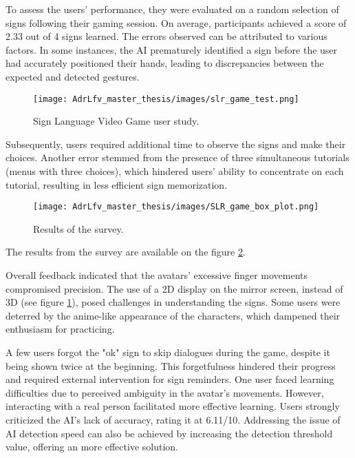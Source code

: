 To assess the users' performance, they were evaluated on a random selection of signs following their gaming session. On average, participants achieved a score of 2.33 out of 4 signs learned. The errors observed can be attributed to various factors. In some instances, the AI prematurely identified a sign before the user had accurately positioned their hands, leading to discrepancies between the expected and detected gestures.

\begin{figure}[h]
    \centering
    \texttt{[image: AdrLfv\_master\_thesis/images/slr\_game\_test.png]}
    \caption{Sign Language Video Game user study.}
    \label{fig:slr_game_test}
\end{figure}

Subsequently, users required additional time to observe the signs and make their choices. Another error stemmed from the presence of three simultaneous tutorials (menus with three choices), which hindered users' ability to concentrate on each tutorial, resulting in less efficient sign memorization.

\begin{figure}[h]
    \centering
    \texttt{[image: AdrLfv\_master\_thesis/images/SLR\_game\_box\_plot.png]}
    \caption{Results of the survey.}
    \label{fig:SLR_game_box_plot}
\end{figure}

The results from the survey are available on the figure \ref{fig:SLR_game_box_plot}.


Overall feedback indicated that the avatars' excessive finger movements compromised precision. The use of a 2D display on the mirror screen, instead of 3D (see figure \ref{fig:slr_game_test}), posed challenges in understanding the signs. Some users were deterred by the anime-like appearance of the characters, which dampened their enthusiasm for practicing.

A few users forgot the "ok" sign to skip dialogues during the game, despite it being shown twice at the beginning. This forgetfulness hindered their progress and required external intervention for sign reminders. One user faced learning difficulties due to perceived ambiguity in the avatar's movements. However, interacting with a real person facilitated more effective learning. Users strongly criticized the AI's lack of accuracy, rating it at 6.11/10. Addressing the issue of AI detection speed can also be achieved by increasing the detection threshold value, offering an more effective solution.

